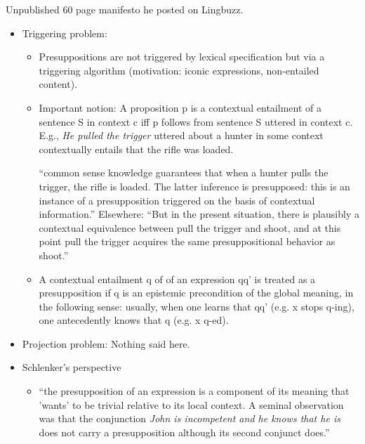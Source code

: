 \documentclass[11pt,fleqn]{article}
\newcommand{\6}{\mbox{$[\hspace*{-.6mm}[$}}
\newcommand{\9}{\mbox{$]\hspace*{-.6mm}]$}}
\begin{document}
Unpublished 60 page manifesto he posted on Lingbuzz.

\begin{itemize}

\item Triggering problem: 

\begin{itemize}

\item Presuppositions are not triggered by lexical specification but via a triggering algorithm (motivation: iconic expressions, non-entailed content).  

\item Important notion: A proposition p is a contextual entailment of a sentence S in context c iff p follows from sentence S uttered in context c. E.g., {\em He pulled the trigger} uttered about a hunter in some context contextually entails that the rifle was loaded. 

``common sense knowledge guarantees that when a hunter pulls the trigger, the rifle is loaded. The latter inference is presupposed: this is an instance of a presupposition triggered on the basis of contextual information.'' Elsewhere:  ``But in the present situation, there is plausibly a contextual equivalence between pull the trigger and shoot, and at this point pull the trigger acquires the same presuppositional behavior as shoot.'' 

\item A contextual entailment q of of an expression qq' is treated as a presupposition if q is an epistemic precondition of the global meaning, in the following sense: usually, when one learns that qq' (e.g. x stops q-ing), one antecedently knows that q (e.g. x q-ed).

\end{itemize}

\item Projection problem: Nothing said here.

\item Schlenker's perspective

\begin{itemize}

\item ``the presupposition of an expression is a component of its meaning that 'wants' to be trivial relative to its local context. A seminal observation was that the conjunction {\em John is incompetent and he knows that he is} does not carry a presupposition although its second conjunct does.''


\end{itemize}
\end{itemize}
\end{document}
